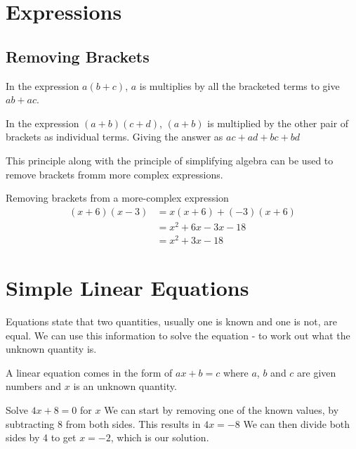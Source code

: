 \section*{Expressions}
\subsection*{Removing Brackets}
In the expression $a(b+c)$, $a$ is multiplies by all the bracketed terms to give $ab+ac$.

In the expression $(a+b) (c+d)$, $(a+b)$ is multiplied by the other pair of brackets as individual terms. Giving the answer as $ac+ad+bc+bd$

This principle along with the principle of simplifying algebra can be used to remove brackets fromm more complex expressions.
\begin{example}{Removing brackets from a more-complex expression}
\begin{align*}
    (x+6)(x-3) & =  x(x+6) + (-3)(x+6)\\
    & =  x^2 + 6x -3x - 18\\
    & =  x^2 + 3x -18
\end{align*}
\end{example}


\section*{Simple Linear Equations}
Equations state that two quantities, usually one is known and one is not, are equal. We can use this information to solve the equation - to work out what the unknown quantity is.

A linear equation comes in the form of $ax+b=c$ where $a$, $b$ and $c$ are given numbers and $x$ is an unknown quantity.
\begin{example}{Solve $4x+8=0$ for $x$}
We can start by removing one of the known values, by subtracting 8 from both sides. This results in 
$4x = -8$
We can then divide both sides by 4 to get $ x = -2$, which is our solution.
\end{example}